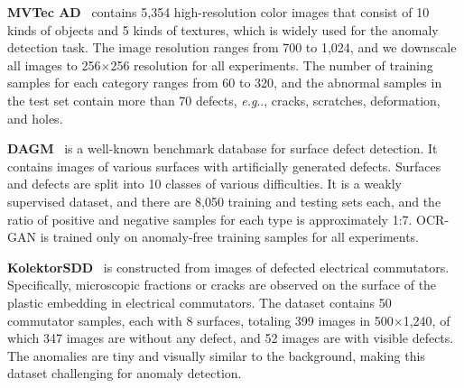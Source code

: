 \documentclass[lettersize,journal]{IEEEtran}
\makeatletter
\DeclareRobustCommand\onedot{\futurelet\@let@token\@onedot}
\def\@onedot{\ifx\@let@token.\else.\null\fi\xspace}
\def\eg{\emph{e.g}\onedot} \def\Eg{\emph{E.g}\onedot}
\makeatother
\begin{document}
\noindent\textbf{MVTec AD}~\cite{bergmann2019mvtec} contains 5,354 high-resolution color images that consist of 10 kinds of objects and 5 kinds of textures, which is widely used for the anomaly detection task. The image resolution ranges from 700 to 1,024, and we downscale all images to 256$\times$256 resolution for all experiments. The number of training samples for each category ranges from 60 to 320, and the abnormal samples in the test set contain more than 70 defects, \eg, cracks, scratches, deformation, and holes.

\noindent\textbf{DAGM}~\cite{wieler2007weakly} is a well-known benchmark database for surface defect detection. It contains images of various surfaces with artificially generated defects. Surfaces and defects are split into 10 classes of various difficulties. It is a weakly supervised dataset, and there are 8,050 training and testing sets each, and the ratio of positive and negative samples for each type is approximately 1:7. OCR-GAN is trained only on anomaly-free training samples for all experiments. 

\noindent\textbf{KolektorSDD}~\cite{krizhevsky2009learning} is constructed from images of defected electrical commutators. Specifically, microscopic fractions or cracks are observed on the surface of the plastic embedding in electrical commutators. The dataset contains 50 commutator samples, each with 8 surfaces, totaling 399 images in 500$\times$1,240, of which 347 images are without any defect, and 52 images are with visible defects. The anomalies are tiny and visually similar to the background, making this dataset challenging for anomaly detection.
\end{document}

